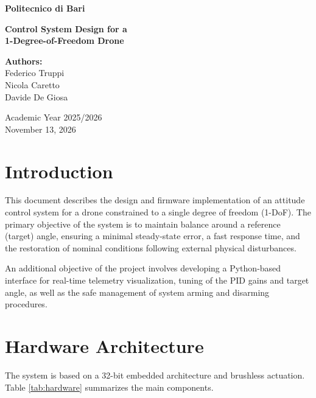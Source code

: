 \documentclass[11pt, a4paper]{article}
\begin{document}
\begin{titlepage}
    \centering
    \vspace*{1.5cm}
    
    {\Large \textbf{Politecnico di Bari} \par}
    
    \vspace{3.5cm}
    
    {\huge \textbf{Control System Design for a\\[0.3cm] 1-Degree-of-Freedom Drone} \par}
    
    \vspace{3.5cm}
    
    \begin{flushleft}
        \large
        \textbf{Authors:}\\
        Federico Truppi\\
        Nicola Caretto\\
        Davide De Giosa
    \end{flushleft}
    
    \vfill
    
    {\large Academic Year 2025/2026\\[0.2cm]
    November 13, 2026 \par}
\end{titlepage}

\tableofcontents
\newpage

\section{Introduction}
This document describes the design and firmware implementation of an attitude control system for a drone constrained to a single degree of freedom (1-DoF). The primary objective of the system is to maintain balance around a reference (target) angle, ensuring a minimal steady-state error, a fast response time, and the restoration of nominal conditions following external physical disturbances.

An additional objective of the project involves developing a Python-based interface for real-time telemetry visualization, tuning of the PID gains and target angle, as well as the safe management of system arming and disarming procedures.

\section{Hardware Architecture}
The system is based on a 32-bit embedded architecture and brushless actuation. Table \ref{tab:hardware} summarizes the main components.
\end{document}
